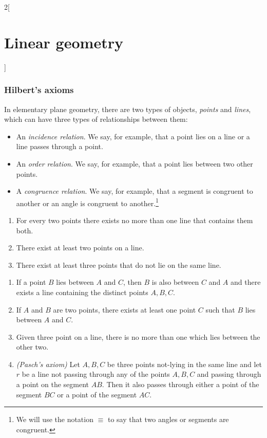 \documentclass[class=article,10pt,crop=false]{standalone}
\begin{document}
\begin{multicols}{2}[\section{Linear geometry}]
\subsubsection{Hilbert's axioms}
\begin{definition}
In elementary plane geometry, there are two types of objects, \textit{points} and \textit{lines}, which can have three types of relationships between them:
\begin{itemize}
    \item An \textit{incidence relation}. We say, for example, that a point lies on a line or a line passes through a point.
    \item An \textit{order relation}. We say, for example, that a point lies between two other points.
    \item A \textit{congruence relation}. We say, for example, that a segment is congruent to another or an angle is congruent to another.\footnote{We will use the notation $\equiv$ to say that two angles or segments are congruent.}
\end{itemize}
\end{definition}
\begin{axiom}
\label{1}
\hfill
\begin{enumerate}
    \item For every two points there exists no more than one line that contains them both.
    \item There exist at least two points on a line.
    \item There exist at least three points that do not lie on the same line.
\end{enumerate}
\end{axiom}
\begin{axiom}
\label{2}
\hfill
\begin{enumerate}
    \item If a point $B$ lies between $A$ and $C$, then $B$ is also between $C$ and $A$ and there exists a line containing the distinct points $A,B,C$.
    \item If $A$ and $B$ are two points, there exists at least one point $C$ such that $B$ lies between $A$ and $C$.
    \item Given three point on a line, there is no more than one which lies between the other two.
    \item \textit{(Pasch's axiom)} Let $A,B,C$ be three points not-lying in the same line and let $r$ be a line not passing through any of the points $A,B,C$ and passing through a point on the segment $AB$. Then it also passes through either a point of the segment $BC$ or a point of the segment $AC$.

\end{enumerate}
\end{axiom}
\end{multicols}
\end{document}
